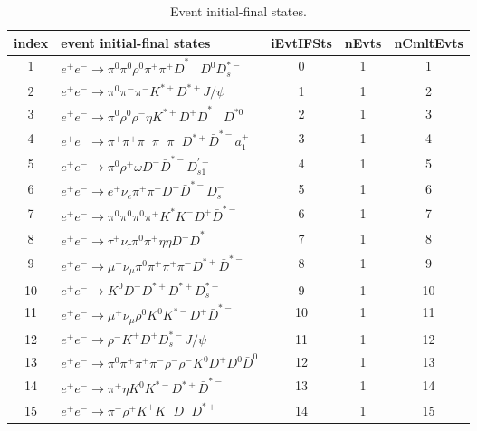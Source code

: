 \documentclass[landscape]{article}
\begin{document}
\begin{table}[htbp!]
\caption{Event initial-final states.}
\small
\centering
\begin{tabular}{|c|>{\centering}p{18cm}|c|c|c|}
\hline
index & event initial-final states & iEvtIFSts & nEvts & nCmltEvts \\
\hline
1 & $ e^{+} e^{-} \rightarrow \pi^{0} \pi^{0} \rho^{0} \pi^{+} \pi^{+} \bar{D}^{*-} D^{0} D_{s}^{*-} $ & 0 & 1 & 1 \\
\hline
2 & $ e^{+} e^{-} \rightarrow \pi^{0} \pi^{-} \pi^{-} K^{*+} D^{*+} J/\psi $ & 1 & 1 & 2 \\
\hline
3 & $ e^{+} e^{-} \rightarrow \pi^{0} \rho^{0} \rho^{-} \eta K^{*+} D^{+} \bar{D}^{*-} D^{*0} $ & 2 & 1 & 3 \\
\hline
4 & $ e^{+} e^{-} \rightarrow \pi^{+} \pi^{+} \pi^{-} \pi^{-} \pi^{-} D^{*+} \bar{D}^{*-} a_{1}^{+} $ & 3 & 1 & 4 \\
\hline
5 & $ e^{+} e^{-} \rightarrow \pi^{0} \rho^{+} \omega D^{-} \bar{D}^{*-} D_{s1}^{\prime+} $ & 4 & 1 & 5 \\
\hline
6 & $ e^{+} e^{-} \rightarrow e^{+} \nu_{e} \pi^{+} \pi^{-} D^{+} \bar{D}^{*-} D_{s}^{-} $ & 5 & 1 & 6 \\
\hline
7 & $ e^{+} e^{-} \rightarrow \pi^{0} \pi^{0} \pi^{0} \pi^{+} K^{*} K^{-} D^{+} \bar{D}^{*-} $ & 6 & 1 & 7 \\
\hline
8 & $ e^{+} e^{-} \rightarrow \tau^{+} \nu_{\tau} \pi^{0} \pi^{+} \eta \eta D^{-} \bar{D}^{*-} $ & 7 & 1 & 8 \\
\hline
9 & $ e^{+} e^{-} \rightarrow \mu^{-} \bar{\nu}_{\mu} \pi^{0} \pi^{+} \pi^{+} \pi^{-} D^{*+} \bar{D}^{*-} $ & 8 & 1 & 9 \\
\hline
10 & $ e^{+} e^{-} \rightarrow K^{0} D^{-} D^{*+} D^{*+} D_{s}^{*-} $ & 9 & 1 & 10 \\
\hline
11 & $ e^{+} e^{-} \rightarrow \mu^{+} \nu_{\mu} \rho^{0} K^{0} K^{*-} D^{+} \bar{D}^{*-} $ & 10 & 1 & 11 \\
\hline
12 & $ e^{+} e^{-} \rightarrow \rho^{-} K^{+} D^{+} D_{s}^{*-} J/\psi $ & 11 & 1 & 12 \\
\hline
13 & $ e^{+} e^{-} \rightarrow \pi^{0} \pi^{+} \pi^{+} \pi^{-} \rho^{-} \rho^{-} K^{0} D^{+} D^{0} \bar{D}^{0} $ & 12 & 1 & 13 \\
\hline
14 & $ e^{+} e^{-} \rightarrow \pi^{+} \eta K^{0} K^{*-} D^{*+} \bar{D}^{*-} $ & 13 & 1 & 14 \\
\hline
15 & $ e^{+} e^{-} \rightarrow \pi^{-} \rho^{+} K^{+} K^{-} D^{-} D^{*+} $ & 14 & 1 & 15 \\

\end{tabular}
\end{table}
\end{document}
